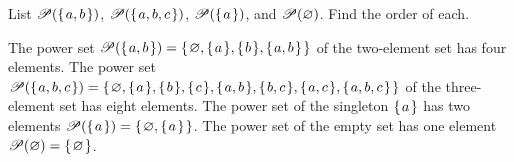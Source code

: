 \documentclass{ibl}  %
\begin{document}
\begin{problem}[\midlength] 
  List 
  $\powerset(\set{a,b})$,   
  $\powerset(\set{a,b,c})$,   
  $\powerset(\set{a})$, and   
  $\powerset(\emptyset)$.
  Find the order of each.   
\begin{answer}
The power set
$\powerset(\set{a,b})=\set{\emptyset, \set{a}, \set{b}, \set{a,b}}$
of the two-element set has four elements.
The power set 
$\powerset(\set{a,b,c})=\set{\emptyset,\set{a},\set{b},\set{c},
                             \set{a,b},\set{b,c},\set{a,c},\set{a,b,c}}$
of the three-element set has eight elements.
The power set of the singleton $\set{a}$ has two elements
$\powerset(\set{a})=\set{\emptyset,\set{a}}$.
The power set of the empty set has one element
$\powerset(\emptyset)=\set{\emptyset}$.   
\end{answer}
\end{problem}
\end{document}
